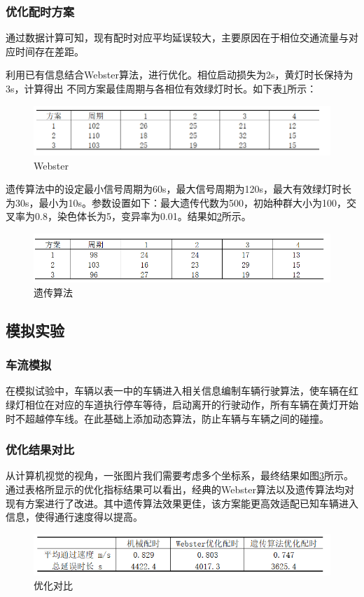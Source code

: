\subsubsection{优化配时方案}
通过数据计算可知，现有配时对应平均延误较大，主要原因在于相位交通流量与对应时间存在差距。

利用已有信息结合Webster算法，进行优化。相位启动损失为2s，黄灯时长保持为3s，计算得出 不同方案最佳周期与各相位有效绿灯时长。如下表\ref{fig:Webster}所示：

\begin{figure}[h]
    \centering
    \includegraphics[scale=0.7]{figures/Webster.png}
    \caption{Webster}
    \label{fig:Webster}
\end{figure}

遗传算法中的设定最小信号周期为60s，最大信号周期为120s，最大有效绿灯时长为30s，最小为10s。参数设置如下：最大遗传代数为500，初始种群大小为100，交叉率为0.8，染色体长为5，变异率为0.01。结果如\ref{fig:遗传算法}所示。

\begin{figure}[h]
    \centering
    \includegraphics[scale=0.7]{figures/遗传算法.png}
    \caption{遗传算法}
    \label{fig:遗传算法}
\end{figure}

\subsection{模拟实验}

\subsubsection{车流模拟}
在模拟试验中，车辆以表一中的车辆进入相关信息编制车辆行驶算法，使车辆在红绿灯相位在对应的车道执行停车等待，启动离开的行驶动作，所有车辆在黄灯开始时不超越停车线。在此基础上添加动态算法，防止车辆与车辆之间的碰撞。

\subsubsection{优化结果对比}
从计算机视觉的视角，一张图片我们需要考虑多个坐标系，最终结果如图\ref{fig:优化对比}所示。通过表格所显示的优化指标结果可以看出，经典的Webster算法以及遗传算法均对现有方案进行了改进。其中遗传算法效果更佳，该方案能更高效适配已知车辆进入信息，使得通行速度得以提高。

\begin{figure}[h]
    \centering
    \includegraphics[scale=0.7]{figures/优化对比.png}
    \caption{优化对比}
    \label{fig:优化对比}
\end{figure}
